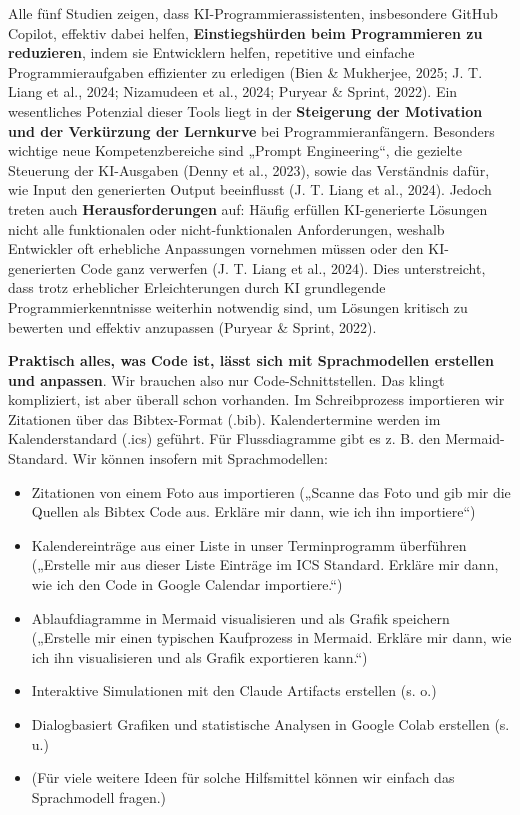 \documentclass[
  ngerman,
  letterpaper,
  DIV=11]{scrreprt}
\providecommand{\tightlist}{%
  \setlength{\itemsep}{0pt}\setlength{\parskip}{0pt}}
\begin{document}
Alle fünf Studien zeigen, dass KI-Programmierassistenten, insbesondere
GitHub Copilot, effektiv dabei helfen, \textbf{Einstiegshürden beim
Programmieren zu reduzieren}, indem sie Entwicklern helfen, repetitive
und einfache Programmieraufgaben effizienter zu erledigen (Bien \&
Mukherjee, 2025; J. T. Liang et al., 2024; Nizamudeen et al., 2024;
Puryear \& Sprint, 2022). Ein wesentliches Potenzial dieser Tools liegt
in der \textbf{Steigerung der Motivation und der Verkürzung der
Lernkurve} bei Programmieranfängern. Besonders wichtige neue
Kompetenzbereiche sind „Prompt Engineering``, die gezielte Steuerung der
KI-Ausgaben (Denny et al., 2023), sowie das Verständnis dafür, wie Input
den generierten Output beeinflusst (J. T. Liang et al., 2024). Jedoch
treten auch \textbf{Herausforderungen} auf: Häufig erfüllen
KI-generierte Lösungen nicht alle funktionalen oder nicht-funktionalen
Anforderungen, weshalb Entwickler oft erhebliche Anpassungen vornehmen
müssen oder den KI-generierten Code ganz verwerfen (J. T. Liang et al.,
2024). Dies unterstreicht, dass trotz erheblicher Erleichterungen durch
KI grundlegende Programmierkenntnisse weiterhin notwendig sind, um
Lösungen kritisch zu bewerten und effektiv anzupassen (Puryear \&
Sprint, 2022).

\textbf{Praktisch alles, was Code ist, lässt sich mit Sprachmodellen
erstellen und anpassen}. Wir brauchen also nur Code-Schnittstellen. Das
klingt kompliziert, ist aber überall schon vorhanden. Im Schreibprozess
importieren wir Zitationen über das Bibtex-Format (.bib).
Kalendertermine werden im Kalenderstandard (.ics) geführt. Für
Flussdiagramme gibt es z. B. den Mermaid-Standard. Wir können insofern
mit Sprachmodellen:

\begin{itemize}
\tightlist
\item
  Zitationen von einem Foto aus importieren („Scanne das Foto und gib
  mir die Quellen als Bibtex Code aus. Erkläre mir dann, wie ich ihn
  importiere``)
\item
  Kalendereinträge aus einer Liste in unser Terminprogramm überführen
  („Erstelle mir aus dieser Liste Einträge im ICS Standard. Erkläre mir
  dann, wie ich den Code in Google Calendar importiere.``)
\item
  Ablaufdiagramme in Mermaid visualisieren und als Grafik speichern
  („Erstelle mir einen typischen Kaufprozess in Mermaid. Erkläre mir
  dann, wie ich ihn visualisieren und als Grafik exportieren kann.``)
\item
  Interaktive Simulationen mit den Claude Artifacts erstellen (s. o.)
\item
  Dialogbasiert Grafiken und statistische Analysen in Google Colab
  erstellen (s. u.)
\item
  (Für viele weitere Ideen für solche Hilfsmittel können wir einfach das
  Sprachmodell fragen.)
\end{itemize}
\end{document}

